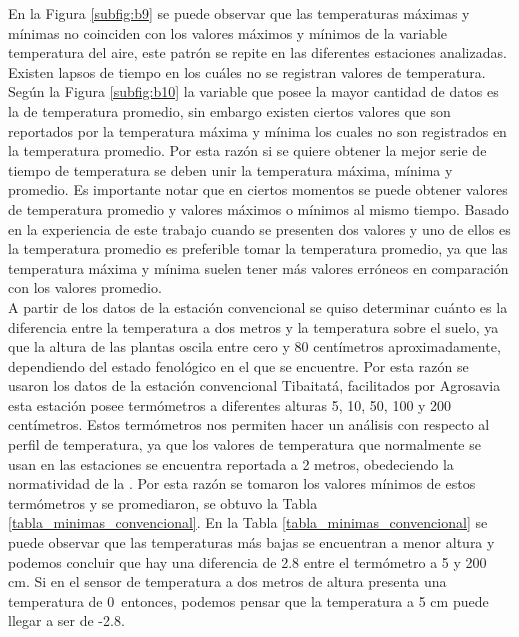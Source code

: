 En la Figura \ref{subfig:b9} se puede observar que las temperaturas máximas y mínimas no coinciden con los valores máximos y mínimos de la variable temperatura del aire, este patrón se repite en las diferentes estaciones analizadas. Existen lapsos de tiempo en los cuáles no se registran valores de temperatura. Según la Figura \ref{subfig:b10} la variable que posee la mayor cantidad de datos es la de temperatura promedio, sin embargo existen ciertos valores que son reportados por la temperatura máxima y mínima los cuales no son registrados en la temperatura promedio. Por esta razón si se quiere obtener la mejor serie de tiempo de temperatura se deben unir la temperatura máxima, mínima y promedio. Es importante notar que en ciertos momentos se puede obtener valores de temperatura promedio y valores máximos o mínimos al mismo tiempo. Basado en la experiencia de este trabajo cuando se presenten dos valores y uno de ellos es la temperatura promedio es preferible tomar la temperatura promedio, ya que las temperatura máxima y mínima suelen tener más valores erróneos en comparación con los valores promedio.\\


A partir de los datos de la estación convencional se quiso determinar cuánto es la diferencia entre la temperatura a dos metros y la temperatura sobre el suelo, ya que la altura de las plantas oscila entre cero y 80 centímetros aproximadamente, dependiendo del estado fenológico en el que se encuentre. Por esta razón se usaron los datos de la estación convencional Tibaitatá, facilitados por Agrosavia esta estación posee termómetros a diferentes alturas 5, 10, 50, 100 y 200 centímetros. Estos termómetros nos permiten hacer un análisis con respecto al perfil de temperatura, ya que los valores de temperatura que normalmente se usan en las estaciones se encuentra reportada a 2 metros, obedeciendo la normatividad de la \citet{WMO2010}. Por esta razón se tomaron los valores mínimos de estos termómetros y se promediaron, se obtuvo la Tabla \ref{tabla_minimas_convencional}. En la Tabla \ref{tabla_minimas_convencional} se puede observar que las temperaturas más bajas se encuentran a menor altura y podemos concluir que hay una diferencia de 2.8 \celsius entre el termómetro a 5 y 200 cm. Si en el sensor de temperatura a dos metros de altura presenta una temperatura de 0\celsius\ entonces, podemos pensar que la temperatura a 5 cm puede llegar a ser de -2.8\celsius.\\

